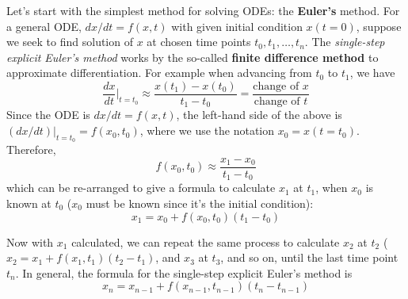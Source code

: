 \documentclass[a4paper,11pt]{article}
\theoremstyle{definition}
\begin{document}
Let's start with the simplest method for solving ODEs: the \textbf{Euler's} method. For a general
ODE, $dx / dt = f(x, t)$ with given initial condition $x(t=0)$, suppose we seek to find solution of $x$
at chosen time points $t_0, t_1, \ldots, t_n$. The \emph{single-step explicit Euler's method} works
by the so-called \textbf{finite difference method} to approximate differentiation. 
For example when advancing from $t_0$ to $t_1$, we have
\begin{equation}
	\frac{d x}{d t}\Big|_{t=t_0} \approx \frac{ x(t_1) - x(t_0) }{t_1 - t_0} = \frac{ \textrm{change of } x }{ \textrm{change of } t }
\end{equation}
\noindent Since the ODE is $dx / dt=f(x,t)$, the left-hand side of the above
is $(dx / dt)|_{t=t_0} = f(x_0,t_0)$, where we use the notation $x_0 = x(t=t_0)$.
Therefore,
\[
	f(x_0,t_0) \approx \frac{ x_1 - x_0 }{t_1 - t_0}
\]
\noindent which can be re-arranged to give a formula to calculate $x_1$ at $t_1$, when $x_0$ is known at $t_0$ 
($x_0$ must be known since it's the initial condition):
\begin{equation}
	x_1 = x_0 + f(x_0,t_0) (t_1 - t_0)
\end{equation}

Now with $x_1$ calculated, we can repeat the same process to calculate $x_2$ at $t_2$ 
($x_2 = x_1 + f(x_1,t_1) (t_2 - t_1)$, and $x_3$ at $t_3$, and so on,
until the last time point $t_n$. In general, the formula for the single-step explicit Euler's method is
\begin{equation} \label{eq:euler}
	x_n = x_{n-1} + f(x_{n-1}, t_{n-1}) (t_n - t_{n-1})
\end{equation}
\end{document}
